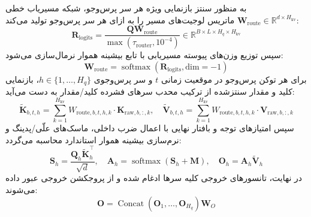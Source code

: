 به منظور سنتز بازنمایی ویژه هر سر پرس‌وجو، شبکه مسیریاب خطی $\mathbf{W}_{\text{route}} \in \mathbb{R}^{d \times H_{\text{kv}}}$ ماتریس لوجیت‌های مسیر را به ازای هر سر پرس‌وجو تولید می‌کند:
\begin{equation}
\mathbf{R}_{\text{logits}} = \frac{\mathbf{Q} \mathbf{W}_{\text{route}}}{\max(\tau_{\text{router}}, 10^{-4})} \in \mathbb{R}^{B \times L \times H_q \times H_{\text{kv}}}
\end{equation}
سپس توزیع وزن‌های پیوسته مسیریابی با تابع بیشینه هموار نرمال‌سازی می‌شود:
\begin{equation}
\mathbf{W}_{\text{route}} = \operatorname{softmax}(\mathbf{R}_{\text{logits}}, \text{dim}=-1)
\end{equation}
برای هر توکن پرس‌وجو در موقعیت زمانی $t$ و سر پرس‌وجوی $h \in \{1, \dots, H_q\}$، بازنمایی کلید و مقدار سنتز‌شده از ترکیب محدب سرهای فشرده کلید/مقدار به دست می‌آید:
\begin{equation}
\tilde{\mathbf{K}}_{b, t, h} = \sum_{k=1}^{H_{\text{kv}}} W_{\text{route}, b, t, h, k} \cdot \mathbf{K}_{\text{raw}, b, :, k}, \quad \tilde{\mathbf{V}}_{b, t, h} = \sum_{k=1}^{H_{\text{kv}}} W_{\text{route}, b, t, h, k} \cdot \mathbf{V}_{\text{raw}, b, :, k}
\end{equation}
سپس امتیازهای توجه و بافتار نهایی با اعمال ضرب داخلی، ماسک‌های علّی/پدینگ و نرم‌سازی بیشینه هموار استاندارد محاسبه می‌گردد:
\begin{equation}
\mathbf{S}_h = \frac{\mathbf{Q}_h \tilde{\mathbf{K}}_h^\top}{\sqrt{d}}, \quad \mathbf{A}_h = \operatorname{softmax}(\mathbf{S}_h + \mathbf{M}), \quad \mathbf{O}_h = \mathbf{A}_h \tilde{\mathbf{V}}_h
\end{equation}
در نهایت، تانسورهای خروجی کلیه سرها ادغام شده و از پروجکشن خروجی عبور داده می‌شوند:
\begin{equation}
\mathbf{O} = \operatorname{Concat}(\mathbf{O}_1, \dots, \mathbf{O}_{H_q}) \mathbf{W}_O
\end{equation}

